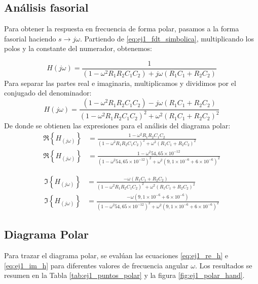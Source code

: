 \subsection{Análisis fasorial}

Para obtener la respuesta en frecuencia de forma polar, pasamos a la forma fasorial haciendo $s \to j\omega$. Partiendo
de \ref{eq:ej1_fdt_simbolica}, multiplicando los polos y la constante del numerador, obtenemos:

\begin{equation}
    H(j\omega) = \frac{1}{(1 - \omega^2 R_1 R_2 C_1 C_2) + j\omega(R_1 C_1 + R_2 C_2)}
\end{equation}
Para separar las partes real e imaginaria, multiplicamos y dividimos por el conjugado del denominador:
\begin{equation*}
    H(j\omega) = \frac{(1 - \omega^2 R_1 R_2 C_1 C_2) - j\omega(R_1 C_1 + R_2 C_2)}{(1 - \omega^2 R_1 R_2 C_1 C_2)^2 + \omega^2(R_1 C_1 + R_2 C_2)^2}
\end{equation*}
De donde se obtienen las expresiones para el análisis del diagrama polar:
\begin{align}
    \Re\left\{H_{(j\omega)}\right\} &= \frac{1 - \omega^2 R_1 R_2 C_1 C_2}{(1 - \omega^2 R_1 R_2 C_1 C_2)^2 + \omega^2(R_1 C_1 + R_2 C_2)^2} \nonumber \\[6pt]
    \Re\left\{H_{(j\omega)}\right\} &= \frac{1 - \omega^2 54,65 \times 10^{-12}}{(1 - \omega^2 54,65 \times 10^{-12})^2 + \omega^2 (9,1 \times 10^{-6} + 6 \times 10^{-6})^2}
    \label{eq:ej1_re_h}
\end{align}

\begin{align}
    \Im\left\{H_{(j\omega)}\right\} &= \frac{- \omega (R_1 C_1 + R_2 C_2)}{(1 - \omega^2 R_1 R_2 C_1 C_2)^2 + \omega^2(R_1 C_1 + R_2 C_2)^2} \nonumber \\[6pt]
    \Im\left\{H_{(j\omega)}\right\} &= \frac{- \omega (9,1 \times 10^{-6} + 6 \times 10^{-6})}{(1 - \omega^2 54,65 \times 10^{-12})^2 + \omega^2 (9,1 \times 10^{-6} + 6 \times 10^{-6})^2}
    \label{eq:ej1_im_h}
\end{align}

\subsection{Diagrama Polar}

Para trazar el diagrama polar, se evalúan las ecuaciones \ref{eq:ej1_re_h} e \ref{eq:ej1_im_h} para diferentes valores de
frecuencia angular $\omega$. Los resultados se resumen en la Tabla \ref{tab:ej1_puntos_polar} y la figura
\ref{fig:ej1_polar_hand}.

